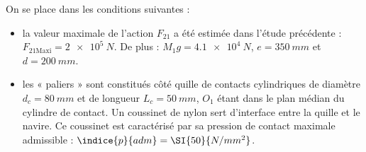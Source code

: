 On se place dans les conditions suivantes :
\begin{itemize}
\item la valeur maximale de l’action $F_{21}$ a été estimée dans l’étude précédente : $F_{21\text{Maxi}} = \SI{2e5}{N}$. De plus : $M_1 g = \SI{4,1e4}{N}$, $e = \SI{350}{mm}$ et $d = \SI{200}{mm}$.
\item les « paliers » sont constitués côté quille de contacts cylindriques de diamètre $d_c = \SI{80}{mm}$ et de longueur $L_c = \SI{50}{mm}$, $O_1$ étant dans le plan médian du cylindre de contact. Un coussinet de nylon sert d’interface entre la quille et le navire. Ce coussinet est caractérisé par sa pression de contact maximale admissible : $\indice{p}{adm} = \SI{50}{N/mm^2}$.
\end{itemize}




